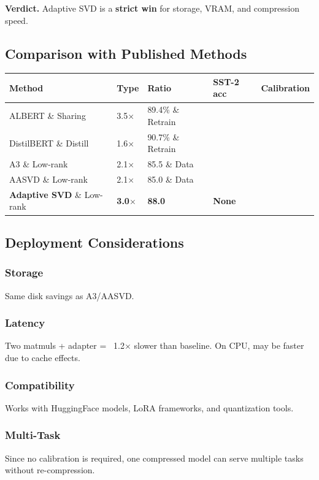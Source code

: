 \textbf{Verdict.} Adaptive SVD is a \textbf{strict win} for storage, VRAM, and 
compression speed.

\subsection{Comparison with Published Methods}

\begin{table}[H]
\centering
\small
\begin{tabular}{lllll}
\toprule
\textbf{Method} & \textbf{Type} & \textbf{Ratio} & \textbf{SST-2 acc} & \textbf{Calibration} \\
\midrule
ALBERT \& Sharing & 3.5$\times$ & 89.4\% \& Retrain \\
DistilBERT \& Distill & 1.6$\times$ & 90.7\% \& Retrain \\
A3 \& Low-rank & 2.1$\times$ & 85.5 \& Data \\
AASVD \& Low-rank & 2.1$\times$ & 85.0 \& Data \\
\textbf{Adaptive SVD} \& Low-rank & \textbf{3.0$\times$} & \textbf{88.0} & \textbf{None} \\
\bottomrule
\end{tabular}
\end{table}

\subsection{Deployment Considerations}

\subsubsection{Storage}
Same disk savings as A3/AASVD.

\subsubsection{Latency}
Two matmuls + adapter = ~1.2$\times$ slower than baseline. On CPU, 
may be faster due to cache effects.

\subsubsection{Compatibility}
Works with HuggingFace models, LoRA frameworks, and quantization tools.

\subsubsection{Multi-Task}
Since no calibration is required, one compressed model can serve multiple 
tasks without re-compression.


